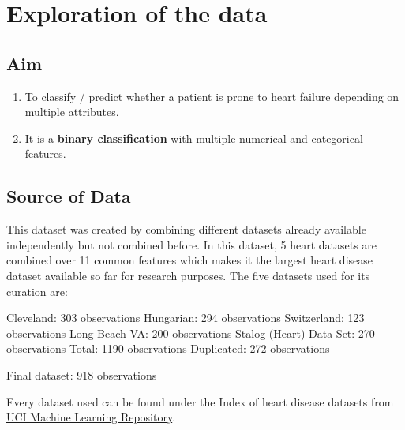 \chapter{Exploration of the data}

\section{Aim} 
\begin{enumerate}
    \item To classify / predict whether a patient is prone to heart failure depending on multiple attributes.
    \item It is a \textbf{binary classification} with multiple numerical and categorical features.
\end{enumerate}

\section{Source of Data}
This dataset was created by combining different datasets already available independently but not combined before. In this dataset, 5 heart datasets are combined over 11 common features which makes it the largest heart disease dataset available so far for research purposes. The five datasets used for its curation are:

Cleveland: 303 observations
Hungarian: 294 observations
Switzerland: 123 observations
Long Beach VA: 200 observations
Stalog (Heart) Data Set: 270 observations
Total: 1190 observations Duplicated: 272 observations

Final dataset: 918 observations

Every dataset used can be found under the Index of heart disease datasets from \href{https://archive.ics.uci.edu/dataset/45/heart+disease}{UCI Machine Learning Repository}.

